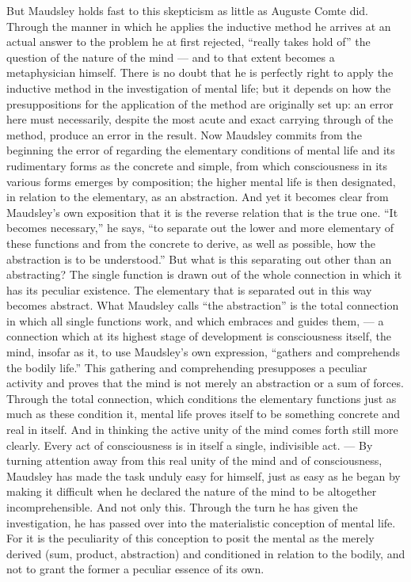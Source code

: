 \documentclass[12pt,a4paper,openany]{book}
\newcommand{\opage}[1]{\marginnote{\footnotesize\textit{[#1]}}}
\begin{document}
But Maudsley holds fast to this skepticism as little as Auguste Comte
did. Through the manner in which he applies the
inductive method he arrives at an actual answer to
the problem he at first rejected, ``really takes hold of'' the question
of the nature of the mind --- and to that extent becomes
a metaphysician himself. There is no doubt that he is perfectly
right to apply the inductive method in the investigation
of mental life; but it depends on how the presuppositions
for the application of the method are originally set up: an error
here must necessarily, despite the most acute and exact
\opage{313}carrying through of the method, produce an error in the result.
Now Maudsley commits from the beginning the error of regarding
the elementary conditions of mental life and its
rudimentary forms as the concrete and simple, from which
consciousness in its various forms emerges by composition;
the higher mental life is then designated, in relation to the
elementary, as an abstraction. And yet it becomes clear from
Maudsley's own exposition that it is the reverse
relation that is the true one. ``It becomes necessary,'' he says,
``to separate out the lower and more elementary of these
functions and from the concrete to derive, as well as possible,
how the abstraction is to be understood.'' But what
is this separating out other than an abstracting? The single
function is drawn out of the whole connection in which
it has its peculiar existence. The elementary that is
separated out in this way becomes abstract. What Maudsley
calls ``the abstraction'' is the total connection in which
all single functions work, and which embraces and guides them,
--- a connection which at its highest stage of development is
consciousness itself, the mind, insofar as it, to use
Maudsley's own expression, ``gathers and comprehends the bodily
life.'' This gathering and comprehending presupposes a
peculiar activity and proves that the mind is not merely an
abstraction or a sum of forces. Through the total
connection, which conditions the elementary functions just as much
as these condition it, mental life proves itself to be
something concrete and real in itself. And in thinking the active
unity of the mind comes forth still more clearly. Every act of consciousness is
in itself a single, indivisible act. --- By turning attention away
from this real unity of the mind and of consciousness,
Maudsley has made the task unduly easy for himself,
just as easy as he began by making it difficult when
he declared the nature of the mind to be altogether incomprehensible. And
not only this. Through the turn he has given
the investigation, he has passed over into the materialistic conception
of mental life. For it is the peculiarity of this conception to
\opage{314}posit the mental as the merely derived (sum, product,
abstraction) and conditioned in relation to the bodily, and
not to grant the former a peculiar essence of its own.
\end{document}
